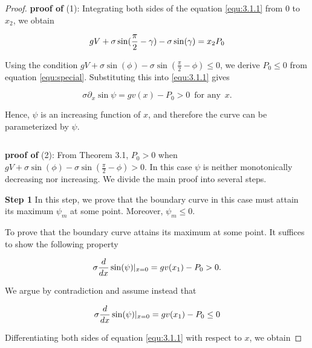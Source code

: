 \documentclass[10pt,a4paper]{amsart}
\begin{document}
    \begin{proof}

    \textbf{proof of} (1):  Integrating both sides of the equation \eqref{equ:3.1.1} from 0 to $x_2$, we obtain

    \begin{equation}{\label{equ:special}}
        gV+\sigma \sin(\frac{\pi}{2}-\gamma)-\sigma\sin(\gamma)=x_2P_{0}
    \end{equation}

    \noindent Using the condition $gV+\sigma \sin(\phi)-\sigma \sin(\frac{\pi}{2}-\phi)\leq 0$, we derive $P_{0}\leq 0$ from equation \eqref{equ:special}. Substituting this into \eqref{equ:3.1.1} gives
    
    \begin{equation*}
        \sigma \partial_{x} \sin\psi=gv(x)-P_{0}>0~\operatorname{for~any}~x.
    \end{equation*}

    \noindent Hence, $\psi$ is an increasing function of $x$, and therefore the curve can be parameterized by $\psi$.

    \begin{equation*}
        ~
    \end{equation*}
    
    \textbf{proof of} (2): From Theorem 3.1, $P_{0}> 0$ when  $gV+\sigma \sin(\phi)-\sigma \sin(\frac{\pi}{2}-\phi)>0$. In this case $\psi$ is neither monotonically decreasing nor increasing. We divide the main proof into several steps.

    \textbf{Step 1} In this step, we prove that the boundary curve in this case must attain its maximum $\psi_{m}$ at some point. Moreover, $\psi_m\leq0$. 
    
    To prove that the boundary curve attains its maximum at some point. It suffices to show the following property

    \begin{equation}{\label{key_assume}}
        \sigma \frac{d}{dx}\sin(\psi)|_{x=0}=gv(x_1)-P_{0}>0.
    \end{equation}

    \noindent We argue by contradiction and assume instead that

    \begin{equation}{\label{equ:3.1.3}}
        \sigma \frac{d}{dx}\sin(\psi)|_{x=0}=gv(x_1)-P_{0}\leq 0
    \end{equation}

     Differentiating both sides of equation \eqref{equ:3.1.1} with respect to $x$, we obtain


\end{proof}
\end{document}
